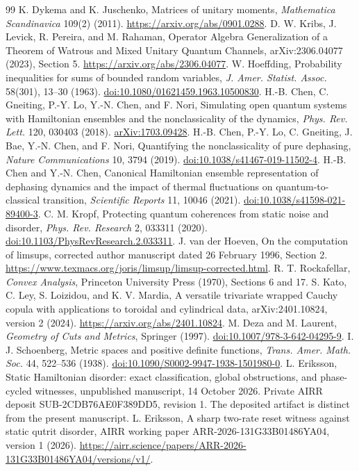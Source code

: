 \documentclass[11pt,a4paper]{article}
\theoremstyle{remark}\newtheorem{remark}[theorem]{Remark}
\begin{document}
\begin{thebibliography}{99}
 K. Dykema and K. Juschenko, Matrices of unitary moments,
\emph{Mathematica Scandinavica} 109(2) (2011).
\url{https://arxiv.org/abs/0901.0288}.
 D. W. Kribs, J. Levick, R. Pereira, and M. Rahaman,
Operator Algebra Generalization of a Theorem of Watrous and Mixed
Unitary Quantum Channels, arXiv:2306.04077 (2023), Section 5.
\url{https://arxiv.org/abs/2306.04077}.
 W. Hoeffding, Probability inequalities for sums of
bounded random variables, \emph{J. Amer. Statist. Assoc.} 58(301),
13--30 (1963).
\href{https://doi.org/10.1080/01621459.1963.10500830}{doi:10.1080/01621459.1963.10500830}.
 H.-B. Chen, C. Gneiting, P.-Y. Lo, Y.-N. Chen,
and F. Nori, Simulating open quantum systems with Hamiltonian ensembles
and the nonclassicality of the dynamics, \emph{Phys. Rev. Lett.} 120,
030403 (2018). \href{https://arxiv.org/abs/1703.09428}{arXiv:1703.09428}.
 H.-B. Chen, P.-Y. Lo, C. Gneiting, J. Bae,
Y.-N. Chen, and F. Nori, Quantifying the nonclassicality of pure dephasing,
\emph{Nature Communications} 10, 3794 (2019).
\href{https://doi.org/10.1038/s41467-019-11502-4}{doi:10.1038/s41467-019-11502-4}.
 H.-B. Chen and Y.-N. Chen, Canonical Hamiltonian ensemble
representation of dephasing dynamics and the impact of thermal
fluctuations on quantum-to-classical transition, \emph{Scientific Reports}
11, 10046 (2021).
\href{https://doi.org/10.1038/s41598-021-89400-3}{doi:10.1038/s41598-021-89400-3}.
 C. M. Kropf, Protecting quantum coherences from static
noise and disorder, \emph{Phys. Rev. Research} 2, 033311 (2020).
\href{https://doi.org/10.1103/PhysRevResearch.2.033311}{doi:10.1103/PhysRevResearch.2.033311}.
 J. van der Hoeven, On the computation of limsups,
corrected author manuscript dated 26 February 1996, Section 2.
\url{https://www.texmacs.org/joris/limsup/limsup-corrected.html}.
 R. T. Rockafellar, \emph{Convex Analysis},
Princeton University Press (1970), Sections 6 and 17.
 S. Kato, C. Ley, S. Loizidou, and K. V. Mardia,
A versatile trivariate wrapped Cauchy copula with applications to
toroidal and cylindrical data, arXiv:2401.10824, version 2 (2024).
\url{https://arxiv.org/abs/2401.10824}.
 M. Deza and M. Laurent, \emph{Geometry of Cuts and
Metrics}, Springer (1997).
\href{https://doi.org/10.1007/978-3-642-04295-9}{doi:10.1007/978-3-642-04295-9}.
 I. J. Schoenberg, Metric spaces and positive
definite functions, \emph{Trans. Amer. Math. Soc.} 44, 522--536 (1938).
\href{https://doi.org/10.1090/S0002-9947-1938-1501980-0}{doi:10.1090/S0002-9947-1938-1501980-0}.
 L. Eriksson, Static Hamiltonian disorder: exact
classification, global obstructions, and phase-cycled witnesses,
unpublished manuscript, 14 October 2026. Private AIRR deposit
SUB-2CDB76AE0F389DD5, revision 1. The deposited artifact is distinct
from the present manuscript.
 L. Eriksson, A sharp two-rate reset witness against static qutrit
disorder, AIRR working paper ARR-2026-131G33B01486YA04, version 1 (2026).
\url{https://airr.science/papers/ARR-2026-131G33B01486YA04/versions/v1/}.
\end{thebibliography}
\end{document}
